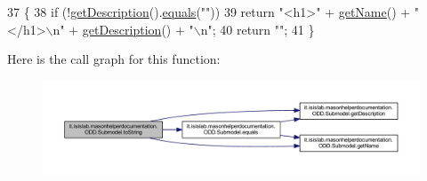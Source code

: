 \begin{DoxyCode}
37                             \{
38         \textcolor{keywordflow}{if} (!\hyperlink{classit_1_1isislab_1_1masonhelperdocumentation_1_1_o_d_d_1_1_submodel_ac22c78907427d00f274530347f035149}{getDescription}().\hyperlink{classit_1_1isislab_1_1masonhelperdocumentation_1_1_o_d_d_1_1_submodel_a2bb03f7d258a5e882219eaf7dd3b8257}{equals}(\textcolor{stringliteral}{""}))
39             \textcolor{keywordflow}{return} \textcolor{stringliteral}{"<h1>"} + \hyperlink{classit_1_1isislab_1_1masonhelperdocumentation_1_1_o_d_d_1_1_submodel_a25ea4ffe85d1b3ce42d22160e573cb50}{getName}() + \textcolor{stringliteral}{"</h1>\(\backslash\)n"} + \hyperlink{classit_1_1isislab_1_1masonhelperdocumentation_1_1_o_d_d_1_1_submodel_ac22c78907427d00f274530347f035149}{getDescription}() + \textcolor{stringliteral}{"\(\backslash\)n"};
40         \textcolor{keywordflow}{return} \textcolor{stringliteral}{""};
41     \}
\end{DoxyCode}


Here is the call graph for this function\-:
\nopagebreak
\begin{figure}[H]
\begin{center}
\leavevmode
\includegraphics[width=350pt]{classit_1_1isislab_1_1masonhelperdocumentation_1_1_o_d_d_1_1_submodel_ab71b66743f9c7314f3e5ec16dccf9173_cgraph}
\end{center}
\end{figure}




